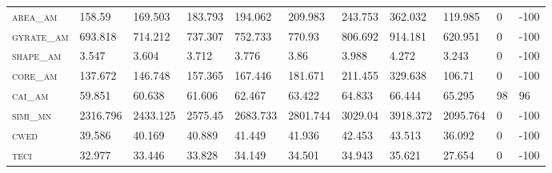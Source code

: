 \begin{landscape}
\begin{table}[!htbp]
\begin{tabular}{@{}lllllllllll@{}}
\small \textsc{area\_am}        & 158.59          & 169.503         & 183.793          & 194.062          & 209.983          & 243.753          & 362.032           & 119.985       & 0                                                                & -100                                                               \\
\small \textsc{gyrate\_am}      & 693.818         & 714.212         & 737.307          & 752.733          & 770.93           & 806.692          & 914.181           & 620.951       & 0                                                                & -100                                                               \\
\small \textsc{shape\_am}       & 3.547           & 3.604           & 3.712            & 3.776            & 3.86             & 3.988            & 4.272             & 3.243         & 0                                                                & -100                                                               \\
\small \textsc{core\_am}        & 137.672         & 146.748         & 157.365          & 167.446          & 181.671          & 211.455          & 329.638           & 106.71        & 0                                                                & -100                                                               \\
\small \textsc{cai\_am}         & 59.851          & 60.638          & 61.606           & 62.467           & 63.422           & 64.833           & 66.444            & 65.295        & 98                                                               & 96                                                                 \\
\small \textsc{simi\_mn}        & 2316.796        & 2433.125        & 2575.45          & 2683.733         & 2801.744         & 3029.04          & 3918.372          & 2095.764      & 0                                                                & -100                                                               \\
\small \textsc{cwed}            & 39.586          & 40.169          & 40.889           & 41.449           & 41.936           & 42.453           & 43.513            & 36.092        & 0                                                                & -100                                                               \\
\small \textsc{teci}            & 32.977          & 33.446          & 33.828           & 34.149           & 34.501           & 34.943           & 35.621            & 27.654        & 0                                                                & -100                                                               \\

\end{tabular}
\end{table}
\end{landscape}
